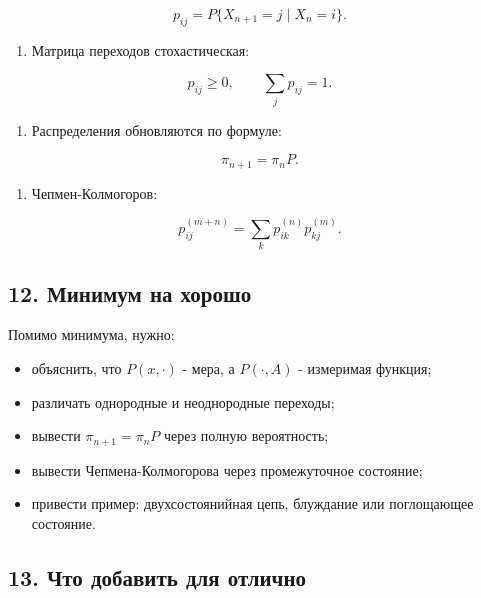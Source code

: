 \documentclass[
  11pt,
  a4paper,
]{article}
\providecommand{\tightlist}{%
  \setlength{\itemsep}{0pt}\setlength{\parskip}{0pt}}
\begin{document}
\[
p_{ij}=P\{X_{n+1}=j\mid X_n=i\}.
\]

\begin{enumerate}
\def\labelenumi{\arabic{enumi}.}
\setcounter{enumi}{2}
\tightlist
\item
  Матрица переходов стохастическая:
\end{enumerate}

\[
p_{ij}\ge0,
\qquad
\sum_jp_{ij}=1.
\]

\begin{enumerate}
\def\labelenumi{\arabic{enumi}.}
\setcounter{enumi}{3}
\tightlist
\item
  Распределения обновляются по формуле:
\end{enumerate}

\[
\pi_{n+1}=\pi_nP.
\]

\begin{enumerate}
\def\labelenumi{\arabic{enumi}.}
\setcounter{enumi}{4}
\tightlist
\item
  Чепмен-Колмогоров:
\end{enumerate}

\[
p_{ij}^{(m+n)}
=
\sum_kp_{ik}^{(n)}p_{kj}^{(m)}.
\]

\subsection{12. Минимум на
хорошо}\label{ux43cux438ux43dux438ux43cux443ux43c-ux43dux430-ux445ux43eux440ux43eux448ux43e}

Помимо минимума, нужно:

\begin{itemize}
\tightlist
\item
  объяснить, что \(P(x,\cdot)\) - мера, а \(P(\cdot,A)\) - измеримая
  функция;
\item
  различать однородные и неоднородные переходы;
\item
  вывести \(\pi_{n+1}=\pi_nP\) через полную вероятность;
\item
  вывести Чепмена-Колмогорова через промежуточное состояние;
\item
  привести пример: двухсостоянийная цепь, блуждание или поглощающее
  состояние.
\end{itemize}

\subsection{13. Что добавить для
отлично}\label{ux447ux442ux43e-ux434ux43eux431ux430ux432ux438ux442ux44c-ux434ux43bux44f-ux43eux442ux43bux438ux447ux43dux43e}
\end{document}
